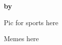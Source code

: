 \documentclass{article}
\begin{document}


\textbf{by} %



\closearticle

\begin{multicols}{2}





\begin{center}
    Pic for sports here
\end{center}






\end{multicols}

\closearticle

\pagebreak



\begin{multicols}{2}





\end{multicols}
\closearticle

\begin{center}
Memes here
\end{center}

\pagebreak


\end{document}
